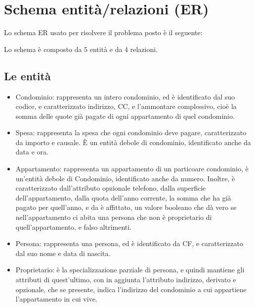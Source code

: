 \section{Schema entità/relazioni (ER)}

Lo schema ER usato per risolvere il problema posto è il seguente:


Lo schema è composto da 5 entità e da 4 relazioni.

\subsection{Le entità}

\begin{itemize}
    \item Condominio: rappresenta un intero condominio, ed è identificato dal suo codice, e caratterizzato indirizzo, CC, 
                      e l'ammontare complessivo, cioè la somma delle quote già pagate di ogni appartamento di quel condominio.
    \item Spesa: rappresenta la spesa che ogni condominio deve pagare, caratterizzato da importo e causale.
                 È un entità debole di condominio, identificato anche da data e ora.
    \item Appartamento: rappresenta un appartamento di un particoare condominio, è un'entità debole di Condominio, identificato anche da numero.
                        Inoltre, è caratterizzato dall'attributo opzionale telefono, dalla superficie dell'appartamento, 
                        dalla quota dell'anno corrente, la somma che ha già pagato per quell'anno, e da è affittato, un valore booleano
                        che dà vero se nell'appartamento ci abita una persona che non è proprietario di quell'appartamento, e falso altrimenti.
    \item Persona: rappresenta una persona, ed è identificato da CF, e caratterizzato dal suo nome e data di nascita.
    \item Proprietario: è la specializzazione parziale di persona, e quindi mantiene gli attributi di quest'ultimo,
                        con in aggiunta l'attributo indirizzo, derivato e opzionale, che se presente,
                        indica l'indirizzo del condominio a cui appartiene l'appartamento in cui vive.                        
\end{itemize}
